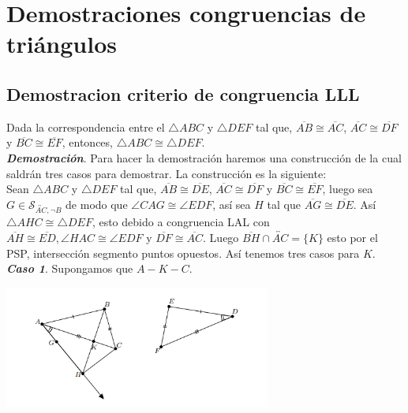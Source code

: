 \documentclass{report}
\begin{document}
    \tableofcontents
    \setlength{\parindent}{0pt}
    \pagebreak
    \chapter{ Demostraciones congruencias de triángulos }
    \section{Demostracion criterio de congruencia LLL}

    Dada la correspondencia entre el $\triangle ABC$ y $\triangle DEF$ tal que, $\overline{AB} \cong \overline{AC}$, $\overline{AC} \cong \overline{DF}$ y $\overline{BC} \cong \overline{EF}$, entonces, $\triangle ABC \cong \triangle DEF$.\\

    \textit{\textbf{Demostración}}. Para hacer la demostración haremos una construcción de la cual saldrán tres casos para demostrar. La construcción es la siguiente:\\

    Sean $\triangle ABC$ y $\triangle DEF$ tal que, $\overline{AB} \cong \overline{DE}$, $\overline{AC} \cong \overline{DF}$ y $\overline{BC} \cong \overline{EF}$, luego sea $G \in \mathcal{S}_{\overleftrightarrow{AC}, \neg B}$ de modo que $\angle CAG \cong \angle EDF$, así sea $H$ tal que $\overline{AG} \cong \overline{DE}$. Así $\triangle AHC \cong \triangle  DEF$, esto debido a congruencia LAL con $\overline{AH} \cong \overline{ED}, \angle HAC \cong \angle EDF$ y $\overline{DF} \cong \overline{AC}$. Luego $\overline{BH} \cap \overleftrightarrow{AC} = \{K\}$ esto por el PSP, intersección segmento puntos opuestos. Así tenemos tres casos para $K$.\\

    \textit{\textbf{Caso 1}}. Supongamos que $A - K - C$.
    \begin{center}
        \includegraphics[height=4cm]{images/caso1.png}
    \end{center}
\end{document}
